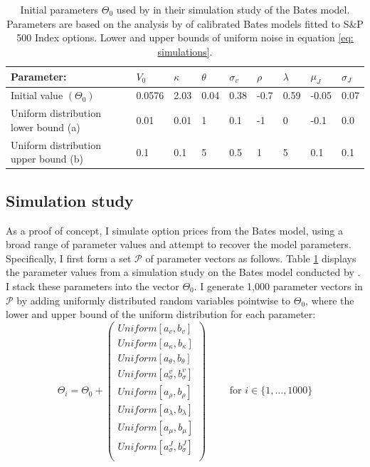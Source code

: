 \documentclass[12pt]{article}
\begin{document}
  \begin{table}[!t]
    \centering
\begin{tabular}{lllllllll}
\toprule
 Parameter:  & $V_0$ & $\kappa$ & $\theta$ & $\sigma_v$ & $\rho$  & $\lambda$ & $\mu_J$ & $\sigma_J$ \\
\midrule
 Initial value $(\Theta_0)$  & 0.0576 & 2.03 & 0.04 & 0.38 & -0.7  & 0.59 & -0.05 & 0.07 \\
\hline Uniform distribution lower bound (a) & 0.01 &  0.01 & 1 & 0.1 &  -1 &  0 & -0.1 & 0.0\\
 Uniform distribution upper bound (b) & 0.1 & 0.1 & 5 & 0.5 & 1 & 5 & 0.1 & 0.1 \\
 \bottomrule
\end{tabular}
    \caption{Initial parameters $\Theta_0$ used by \cite{lindstrom2008sequential} in their simulation study of the Bates model. Parameters are based on the analysis by \cite{bakshi1997empirical} of calibrated Bates models fitted to S\&P 500 Index options. Lower and upper bounds of uniform noise in equation \eqref{eq: simulations}. }
    \label{tab:init_params}
\end{table}


\subsection{Simulation study}\label{subsec: simulations}
As a proof of concept, I simulate option prices from the Bates model, using a broad range of parameter values and attempt to recover the model parameters. Specifically, I first form a set $\mathcal{P}$ of parameter vectors as follows. Table \ref{tab:init_params} displays the parameter values from a simulation study on the Bates model conducted by \cite{lindstrom2008sequential}. I stack these parameters into the vector $\Theta_0$. I generate 1,000 parameter vectors in $\mathcal{P}$ by adding uniformly distributed random variables pointwise to $\Theta_0$, where the lower and upper bound of the uniform distribution for each parameter:
\begin{equation}\label{eq: simulations}
    \Theta_i = \Theta_0 +  
\begin{pmatrix}
Uniform[a_v, b_v] \\
Uniform[a_\kappa, b_\kappa] \\
Uniform[a_\theta, b_\theta] \\
Uniform[a_\sigma^v, b_\sigma^v] \\
Uniform[a_\rho, b_\rho] \\
Uniform[a_\lambda, b_\lambda] \\
Uniform[a_\mu, b_\mu] \\
Uniform[a_\sigma^J, b_\sigma^J] \\ 
\end{pmatrix} \quad\quad \text{ for } i \in \lbrace 1, \ldots, 1000\rbrace
\end{equation}
\end{document}
